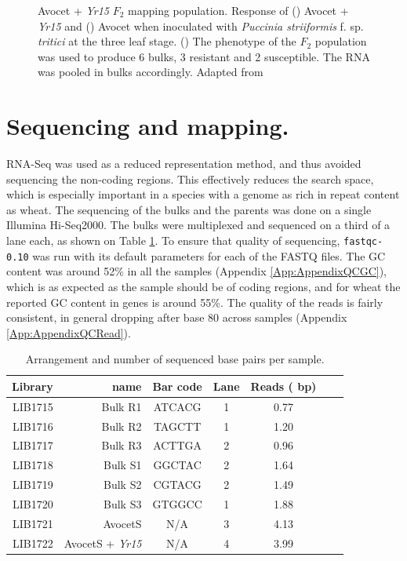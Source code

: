 \begin{figure}
    \caption[Avocet + \textit{Yr15} $F_{2}$  mapping population.]{Avocet + \textit{Yr15} $F_{2}$  mapping population. Response of () Avocet + \textit{Yr15} and () Avocet when inoculated with \textit{Puccinia striiformis} f. sp.  \textit{tritici} at the three leaf stage. () The phenotype of the $F_{2}$ population was used to produce 6 bulks, 3 resistant and 2 susceptible. The RNA was pooled in bulks accordingly. Adapted from \citep{Ramirez-Gonzalez2015b}}

\end{figure}


\section{Sequencing and mapping.} 

RNA-Seq was used as a reduced representation method, and thus avoided sequencing the non-coding regions.
This effectively reduces the search space, which is especially important in a species with a genome as rich in repeat content as wheat.
The sequencing of the bulks and the parents was done on a single Illumina Hi-Seq2000.
The bulks were multiplexed and sequenced on a third of a lane each, as shown on Table \ref{tab:yr15:reads}. 
To ensure that quality of sequencing, \verb|fastqc-0.10| \citep{fastqc}  was run with its default parameters for each of the FASTQ files.  
The GC content was around 52\% in all the samples (Appendix \ref{App:AppendixQCGC}), which is as expected as the sample should be of coding regions, and for wheat the reported GC content in genes is around 55\%.  
The quality of the reads is fairly consistent, in general dropping after base 80 across samples (Appendix \ref{App:AppendixQCRead}). 
\label{yr15:sequencing}

\begin{table}
\centering
\caption{Arrangement and number of sequenced base pairs per sample. }
\label{tab:yr15:reads}
\begin{tabular}{rrccccc}
\toprule
Library & name & Bar code & Lane   &  Reads (\e{8} bp)\\ 
\midrule
LIB1715 & Bulk R1 & ATCACG & 1  & 0.77\\
LIB1716 & Bulk R2 & TAGCTT & 1    & 1.20\\
LIB1717 & Bulk R3 & ACTTGA & 2  & 0.96  \\ 
LIB1718 & Bulk S1 & GGCTAC & 2  & 1.64   \\ 
LIB1719 & Bulk S2 & CGTACG & 2  & 1.49  \\ 
LIB1720 & Bulk S3 & GTGGCC & 1  &1.88  \\ 
LIB1721 & AvocetS & N/A & 3     & 4.13 \\ 
LIB1722 & AvocetS + \textit{Yr15} & N/A & 4   & 3.99  \\ 
\bottomrule
\end{tabular}
\end{table}



